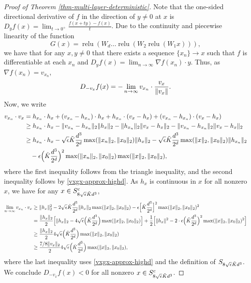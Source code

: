 \documentclass[11pt]{article}
\newcommand{\eps}{\epsilon}
\newcommand{\red}[1]{{\color{black} #1}}
\newcommand{\xo}{x_0}
\newcommand{\Win}[1]{W_{#1}}
\newcommand{\vx}{v_{x}}
\newcommand{\vxn}{v_{x_n}}
\newcommand{\hxn}{h_{x_n}}
\newcommand{\hx}{h_x}
\newcommand{\xn}{x_{n}}
\newcommand{\Ktilde}{\tilde{K}}
\DeclareMathOperator{\relu}{relu}
\begin{document}
\begin{proof}[Proof of Theorem \ref{thm-multi-layer-deterministic}]
Note that the one-sided directional derivative of $f$ in the direction of $y\neq 0$ at $x$ is $D_{y} f(x) = \lim_{t \to 0^+} \frac{f(x+t y) - f(x)}{t}$.  Due to the continuity and piecewise linearity of the function \[G(x) = \relu(\Win{d} \ldots \relu (\Win{2} \relu(\Win{1} x))  ),\] we have that for any $x, y \neq 0$ that there exists a sequence $\{x_n\} \to x$ such that $f$ is differentiable at each $x_n$ and $D_y f(x) = \lim_{n \to \infty} \nabla f(x_n)\cdot y$. Thus, as $\nabla f(x_n) = v_{x_n}$, 
\[
D_{-\vx} f(x)= - \lim_{n \to \infty} \vxn \cdot \red{\frac{\vx}{\|\vx\|}}.
\]
Now, we write
\begin{align*}
\vxn \cdot \vx &= \hxn \cdot \hx + (\vxn - \hxn) \cdot \hx + \hxn \cdot (\vx - \hx) + (\vxn - \hxn) \cdot (\vx - \hx)\\
&\geq \hxn \cdot \hx  - \| \vxn - \hxn\|_2 \| \hx\|_2  - \| \hxn \|_2 \|\vx - \hx\|_2 - \| \vxn - \hxn\|_2 \|\vx - \hx\|_2 \\
&\geq \hxn \cdot \hx -  \sqrt{\eps}  \Ktilde \frac{d^3}{2^d}  \max(\| \xn\|_2, \|\xo\|_2) \| \hx\|_2  -  \sqrt{\eps} \Ktilde \frac{d^3}{2^d} \max(\|x\|_2, \|\xo\|_2) \| \hxn\|_2 \\ & \ \ \ -  \eps  \Bigl(\Ktilde \frac{d^3}{2^d} \Bigr)^2 \max(\|\xn\|_2, \|\xo\|_2)  \max(\|x\|_2, \|\xo\|_2),
\end{align*}
where the first inequality follows from the triangle inequality, and the second inequality follows by \eqref{vxgx-approx-highd}.
As $\hx$ is continuous in $x$ for all nonzero $x$, we have for any $x \in S_{\red{8 \sqrt{\eps}} \Ktilde d^3 }^c$, 
\begin{align*}
\lim_{n \to \infty} \vxn \cdot \vx &\geq \| \hx\|_2^2 - 2 \red{\sqrt{\eps}} \Ktilde \frac{d^3}{2^d} \| \hx\|_2 \max(\|x\|_2, \|\xo\|_2) -  \eps \Bigl [ \Ktilde \frac{d^3}{2^d} \Bigr]^2 \max(\|x\|_2, \|\xo\|_2)^2 \\
&= \frac{\|\hx\|_2}{2} \Bigl [ \| \hx\|_2 - 4 \sqrt{\eps} \Bigl ( \Ktilde \frac{d^3}{2^d} \Bigr) \max(\|x\|_2, \|\xo\|_2) \Bigr]  + \frac{1}{2} \Bigl[ \| \hx \|^2 -2 \cdot  \eps \Bigl ( \Ktilde \frac{d^3}{2^d} \Bigr)^2 \max(\|x\|_2, \|\xo\|_2 )^2   \Bigr] \\
&\geq \red{  \frac{\|\hx\|_2}{2}  4 \sqrt{\eps} \Bigl ( \Ktilde \frac{d^3}{2^d} \Bigr) \max(\|x\|_2, \|\xo\|_2)    } \\
 &\geq \red{ \frac{7/8 \|\vx\|_2}{2} 4 \sqrt{\eps} \Bigl ( \Ktilde \frac{d^3}{2^d} \Bigr) \max(\|x\|_2, \|\xo\|_2), }\\
\end{align*}
\red{where the last inequality uses \eqref{vxgx-approx-highd} and the definition of $S_{\red{8 \sqrt{\eps}} \Ktilde d^3 }$.}
We conclude $D_{-\vx} f(x) < 0$ for all nonzero $x \in S_{\red{8} \sqrt{\eps} \Ktilde d^3}^c$.




\end{proof}
\end{document}
